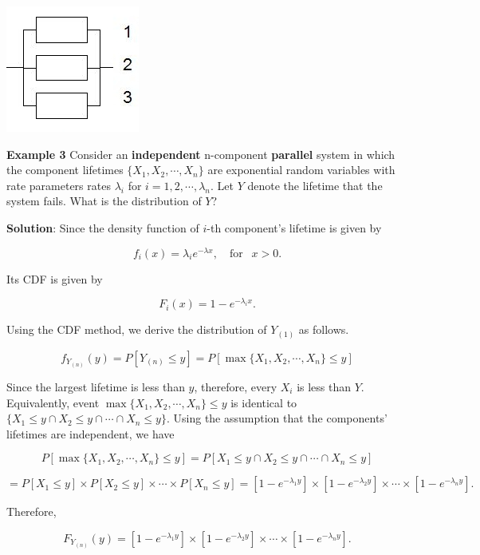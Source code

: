 \documentclass[
]{book}
\begin{document}
\begin{center}\includegraphics[width=0.35\linewidth]{topic12/parallelSystem} \end{center}

\textbf{\color{red}Example 3} Consider an \textbf{\color{red} independent} n-component \textbf{parallel} system in which the component lifetimes \(\{ X_1, X_2, \cdots, X_n \}\) are exponential random variables with rate parameters rates \(\lambda_i\) for \(i = 1,2, \cdots, \lambda_n\). Let \(Y\) denote the lifetime that the system fails. What is the distribution of \(Y\)?

\textbf{Solution}: Since the density function of \(i\)-th component's lifetime is given by

\[
f_i(x) = \lambda_i e^{-\lambda x}, \ \ \ \text{ for } \ \ x > 0.
\]

Its CDF is given by

\[
F_i(x) = 1 - e^{-\lambda_i x}.
\]

Using the CDF method, we derive the distribution of \(Y_{(1)}\) as follows.

\[
f_{Y_{(n)}}(y) = P[Y_{(n)} \le y] = P[\max \{X_1, X_2, \cdots, X_n \} \le y] 
\]

Since the largest lifetime is less than \(y\), therefore, every \(X_i\) is less than \(Y\). Equivalently, event \(\max \{X_1, X_2, \cdots, X_n \} \le y\) is identical to \(\{X_1 \le y \cap X_2 \le y \cap \cdots \cap X_n \le y\}\). Using the assumption that the components' lifetimes are independent, we have

\[
P[\max \{X_1, X_2, \cdots, X_n \} \le y] = P[X_1  \le y \cap X_2 \le y \cap \cdots \cap X_n \le y] 
\]

\[
= P[X_1 \le y] \times P[ X_2 \le y] \times  \cdots \times P[ X_n \le y] =[1-e^{-\lambda_1y}]\times [1-e^{-\lambda_2y}]\times \cdots \times [1-e^{-\lambda_ny}].
\]

Therefore,

\[
F_{Y_{(n)}}(y) = [1-e^{-\lambda_1y}]\times [1-e^{-\lambda_2y}]\times \cdots \times [1-e^{-\lambda_ny}].
\]
\end{document}

